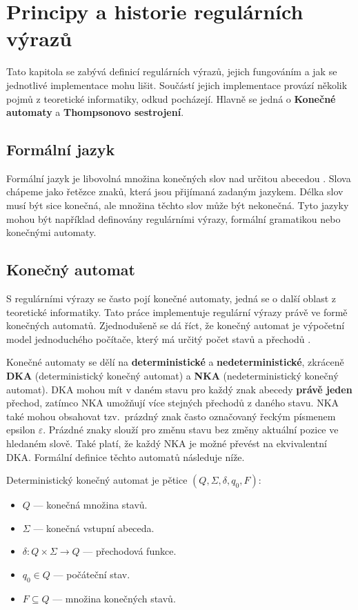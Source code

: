 \chapter{Principy a historie regulárních výrazů}\label{sec:Principle}

Tato kapitola se zabývá definicí regulárních výrazů, jejich fungováním a jak se jednotlivé implementace mohu lišit. 
Součástí jejich implementace provází několik pojmů z teoretické informatiky, odkud pocházejí.
Hlavně se jedná o \textbf{Konečné automaty} a \textbf{Thompsonovo sestrojení}.

\section{Formální jazyk}
Formální jazyk je libovolná množina konečných slov nad určitou abecedou \cite{MUNIFL}. 
Slova chápeme jako řetězce znaků, která jsou přijímaná zadaným jazykem.
Délka slov musí být sice konečná, ale množina těchto slov může být nekonečná. 
Tyto jazyky mohou být například definovány regulárními výrazy, formální gramatikou nebo konečnými automaty. 

\section{Konečný automat}\label{sec:FiniteAutomaton}
S regulárními výrazy se často pojí konečné automaty, jedná se o další oblast z teoretické informatiky.
Tato práce implementuje regulární výrazy právě ve formě konečných automatů.
Zjednodušeně se dá říct, že konečný automat je výpočetní model jednoduchého počítače, který má určitý počet stavů a přechodů \cite{Havrlant}. 

Konečné automaty se dělí na \textbf{deterministické} a \textbf{nedeterministické}, zkráceně \textbf{DKA} (deterministický konečný automat) a \textbf{NKA} (nedeterministický konečný automat).
DKA mohou mít v daném stavu pro každý znak abecedy \textbf{právě jeden} přechod, zatímco NKA umožňují více stejných přechodů z daného stavu. 
NKA také mohou obsahovat tzv.\ prázdný znak často označovaný řeckým písmenem epsilon $\varepsilon$. 
Prázdné znaky slouží pro změnu stavu bez změny aktuální pozice ve hledaném slově. 
Také platí, že každý NKA je možné převést na ekvivalentní DKA.
Formální definice těchto automatů následuje níže.

\newpage

\noindent Deterministický konečný automat je pětice $(Q, \Sigma, \delta, q_0, F)$\cite{Viswanathan_2017}:
\begin{itemize}
	\item $Q$ --- konečná množina stavů.
	\item $\Sigma$ --- konečná vstupní abeceda.
	\item $\delta: Q \times \Sigma \rightarrow Q$ --- přechodová funkce.
	\item $q_0 \in Q$ --- počáteční stav.
	\item $F \subseteq Q$ --- množina konečných stavů.
\end{itemize}

